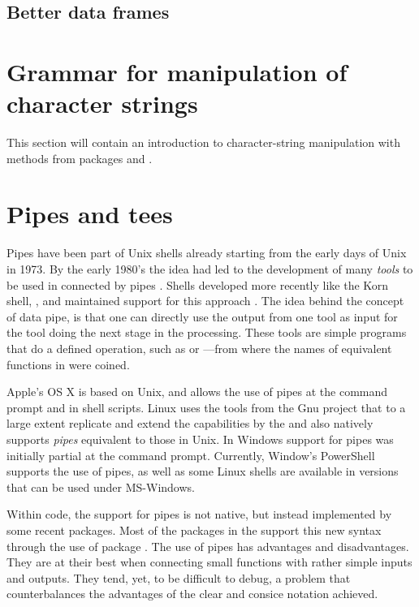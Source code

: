 \documentclass[krantz2]{krantz}\usepackage{knitr}%
\begin{document}
\subsection{Better data frames}

\section{Grammar for manipulation of character strings}\label{sec:data:strings}

\begin{warningbox}
  This section will contain an introduction to character-string manipulation with methods from packages  and .
\end{warningbox}

\section{Pipes and tees}\label{sec:data:pipes}

Pipes have been part of Unix shells already starting from the early days of Unix in 1973. By the early 1980's the idea had led to the development of many \emph{tools} to be used in  connected by pipes \autocite{Kernigham1981}. Shells developed more recently like the Korn shell, , and  maintained support for this approach \autocite{Rosenblatt1993}. The idea behind the concept of data pipe, is that one can directly use the output from one tool as input for the tool doing the next stage in the processing. These tools are simple programs that do a defined operation, such as  or ---from where the names of equivalent functions in  were coined.

Apple's OS X is based on Unix, and allows the use of pipes at the command prompt and in shell scripts. Linux uses the tools from the Gnu project that to a large extent replicate and extend the capabilities  by the and also natively supports \emph{pipes} equivalent to those in Unix. In Windows support for pipes was initially partial at the command prompt. Currently, Window's PowerShell supports the use of pipes, as well as some Linux shells are available in versions that can be used under MS-Windows.

Within \Rlang code, the support for pipes is not native, but instead implemented by some recent packages. Most of the packages in the  support this new syntax through the use of package . The use of pipes has advantages and disadvantages. They are at their best when connecting small functions with rather simple inputs and outputs. They tend, yet, to be difficult to debug, a problem that counterbalances the advantages of the clear and consice notation achieved.
\end{document}
